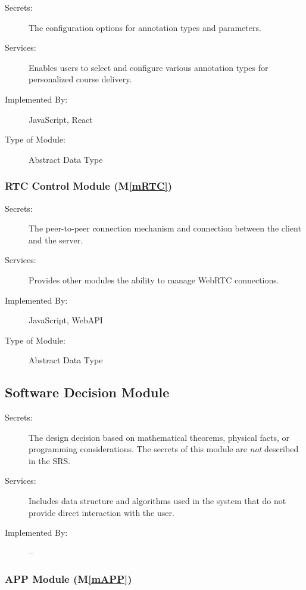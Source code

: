 \documentclass[12pt, titlepage]{article}
\newcommand{\mref}[1]{M\ref{#1}}
\begin{document}
\begin{description}
\item[Secrets:] The configuration options for annotation types and parameters.
\item[Services:] Enables users to select and configure various annotation types for personalized course delivery.
\item[Implemented By:] JavaScript, React
\item[Type of Module:] Abstract Data Type
\end{description}

\subsubsection{RTC Control Module (\mref{mRTC})}

\begin{description}
\item[Secrets:] The peer-to-peer connection mechanism and connection between the client and the server.
\item[Services:] Provides other modules the ability to manage WebRTC connections.
\item[Implemented By:] JavaScript, WebAPI
\item[Type of Module:] Abstract Data Type
\end{description}

\subsection{Software Decision Module}

\begin{description}
\item[Secrets:] The design decision based on mathematical theorems, physical
  facts, or programming considerations. The secrets of this module are
  \emph{not} described in the SRS.
\item[Services:] Includes data structure and algorithms used in the system that
  do not provide direct interaction with the user. 
\item[Implemented By:] --
\end{description}

\subsubsection{APP Module (\mref{mAPP})}
\end{document}
